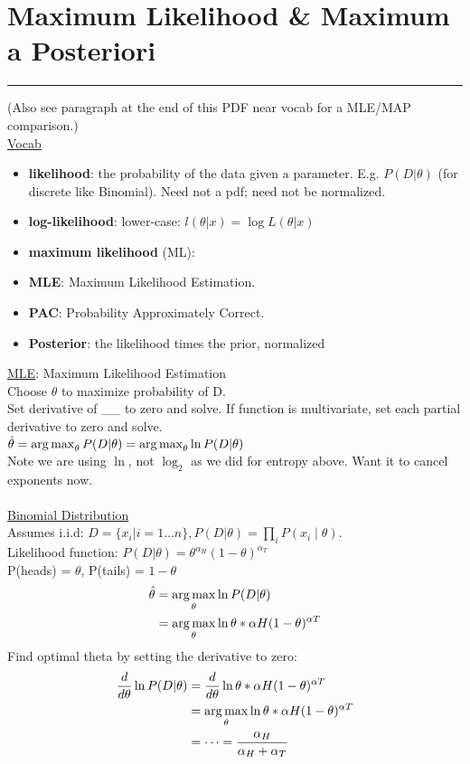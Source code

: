 \section{Maximum Likelihood \& Maximum a Posteriori}
\smallskip \hrule height 2pt \smallskip
(Also see paragraph at the end of this PDF near vocab for a MLE/MAP comparison.) \hfill \\

\underline{Vocab}
\begin{itemize}
	\item\textbf{likelihood}: the probability of the data given a parameter.  E.g. $P(D | \theta)$ (for discrete like Binomial).  
	Need not a pdf; need not be normalized.   %
 	\item \textbf{log-likelihood}: lower-case: $l(\theta|x) = \log L(\theta | x)$
	\item \textbf{maximum likelihood} (ML): 
	\item \textbf{MLE}: Maximum Likelihood Estimation. 
	\item \textbf{PAC}: Probability Approximately Correct. 
	\item \textbf{Posterior}: the likelihood times the prior, normalized  %
\end{itemize}
 
\underline{MLE}: Maximum Likelihood Estimation \hfill \\
Choose $\theta$ to maximize probability of D. \hfill \\
Set derivative of \_\_ to zero and solve.  If function is multivariate, set each partial derivative to zero and solve. \hfill \\
$\hat{\theta} = \operatorname*{arg\,max}_\theta P(D | \theta) = \operatorname*{arg\,max}_\theta \ln P(D | \theta) $ \hfill \\
Note we are using $\ln$, not $\log_2$ as we did for entropy above.  Want it to cancel exponents now. 
 \hfill \\
 
\hfill \\
\underline{Binomial Distribution} \hfill \\
Assumes i.i.d: $D=\{x_i | i=1 \dots n\}, P(D | \theta) = \prod_i P(x_i \mid \theta)$. \hfill \\
Likelihood function: $P(D | \theta) = \theta^{\alpha_H} (1-\theta)^{\alpha_T}$  \hfill \\
P(heads) = $\theta$, P(tails) = $1 - \theta$ \hfill \\
\begin{align*} 
	\hat{\theta} &= \operatorname*{arg\,max}_\theta \ln P(D| \theta) \\
	 	 &= \operatorname*{arg\,max}_\theta \ln \theta*{\alpha H}(1-\theta)^{\alpha T}
\end{align*}
Find optimal theta by setting the derivative to zero: 
\begin{align*} 
	\frac{d}{d\theta} \ln P(D| \theta) &= \frac{d}{d\theta}  \ln \theta*{\alpha H}(1-\theta)^{\alpha T} \\
	 	 &= \operatorname*{arg\,max}_\theta \ln \theta*{\alpha H}(1-\theta)^{\alpha T} \\
		 & = \dots = \frac{\alpha_H}{\alpha_H  + \alpha_T}
\end{align*}

